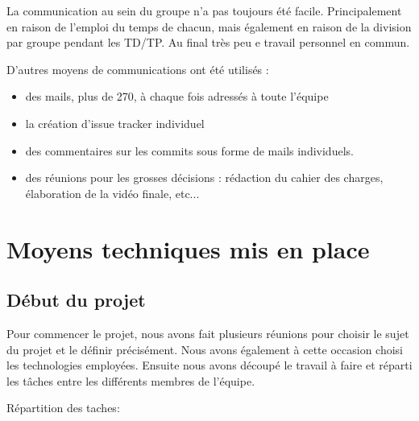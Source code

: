 \documentclass{report}
\begin{document}
La communication au sein du groupe n’a pas toujours été facile.
Principalement en raison de l’emploi du temps de chacun, mais également
en raison de la division par groupe pendant les TD/TP. Au final très peu
e travail personnel en commun.

D’autres moyens de communications ont été utilisés :
\begin{itemize}
\item des mails, plus de 270, à chaque fois adressés à toute l’équipe
\item la création d’issue tracker individuel
\item des commentaires sur les commits sous forme de mails individuels.
\item des réunions pour les grosses décisions : rédaction du cahier des
charges, élaboration de la vidéo finale, etc...
\end{itemize}

\section{Moyens techniques mis en place}

\subsection{Début du projet}
Pour commencer le projet, nous avons fait plusieurs réunions pour
choisir le sujet du projet et le définir précisément. Nous avons
également à cette occasion choisi les technologies employées.
Ensuite nous avons découpé le travail à faire et réparti les tâches
entre les différents membres de l’équipe.

Répartition des taches:
\end{document}
